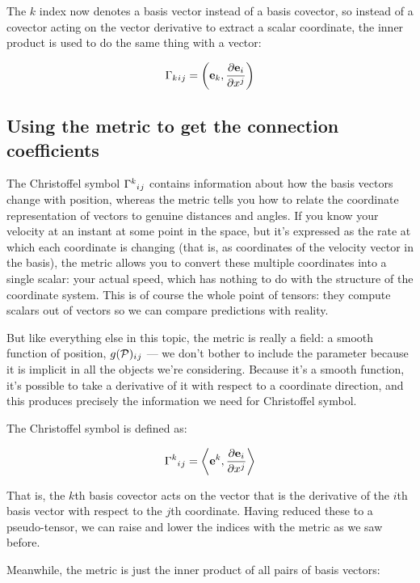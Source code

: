 The $k$ index now denotes a basis vector instead of a basis covector, so instead of a covector acting on the vector derivative to extract a scalar coordinate, the inner product is used to do the same thing with a vector:

$$
\Gamma\indices{_k_i_j} = \left( \vec{e}_k , \frac{\partial \vec{e}_i}{\partial x^j} \right)
$$

\subsection{Using the metric to get the connection coefficients}

The Christoffel symbol $\Gamma\indices{^k_i_j}$ contains information about how the basis vectors change with position, whereas the metric tells you how to relate the coordinate representation of vectors to genuine distances and angles. If you know your velocity at an instant at some point in the space, but it's expressed as the rate at which each coordinate is changing (that is, as coordinates of the velocity vector in the basis), the metric allows you to convert these multiple coordinates into a single scalar: your actual speed, which has nothing to do with the structure of the coordinate system. This is of course the whole point of tensors: they compute scalars out of vectors so we can compare predictions with reality.

But like everything else in this topic, the metric is really a field: a smooth function of position, $g(\mathcal{P})\indices{_i_j}$ --- we don't bother to include the parameter because it is implicit in all the objects we're considering. Because it's a smooth function, it's possible to take a derivative of it with respect to a coordinate direction, and this produces precisely the information we need for Christoffel symbol.

The Christoffel symbol is defined as:

\begin{equation}
    \Gamma\indices{^k_i_j}
=
\biggl<
\vec{e}^k,
\frac{\partial \vec{e}_i}{\partial x^j}
\biggr>
\end{equation}

That is, the $k$th basis covector acts on the vector that is the derivative of the $i$th basis vector with respect to the $j$th coordinate. Having reduced these to a pseudo-tensor, we can raise and lower the indices with the metric as we saw before.

Meanwhile, the metric is just the inner product of all pairs of basis vectors:

